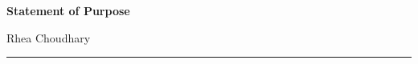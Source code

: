 \noindent
\begin{minipage}[t]{0.60\textwidth}
  {\large\bfseries Statement of Purpose}
\end{minipage}\hfill
\begin{minipage}[t]{0.38\textwidth}
  \raggedleft
  Rhea Choudhary\\[2pt]
  \schoolheader
\end{minipage}

\vspace{0.5em}
\noindent\rule{\textwidth}{0.8pt}

\vspace{1.1em}
